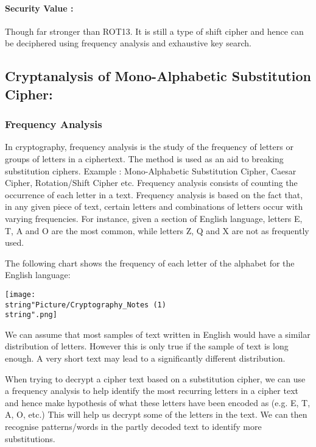 \documentclass[british]{article}
\begin{document}
\paragraph*{Security Value : }

Though far stronger than ROT13. It is still a type of shift cipher
and hence can be deciphered using frequency analysis and exhaustive
key search.

\vfill{}


\subsection{Cryptanalysis of Mono-Alphabetic Substitution Cipher:}

\subsubsection{Frequency Analysis}

In cryptography, frequency analysis is the study of the frequency
of letters or groups of letters in a ciphertext. The method is used
as an aid to breaking substitution ciphers. Example : Mono-Alphabetic
Substitution Cipher, Caesar Cipher, Rotation/Shift Cipher etc. Frequency
analysis consists of counting the occurrence of each letter in a text.
Frequency analysis is based on the fact that, in any given piece of
text, certain letters and combinations of letters occur with varying
frequencies. For instance, given a section of English language, letters
E, T, A and O are the most common, while letters Z, Q and X are not
as frequently used.

\medskip{}

\begin{center}
The following chart shows the frequency of each letter of the alphabet
for the English language:
\par\end{center}

\begin{center}
\texttt{[image: \\string"Picture/Cryptography\_Notes (1)\\string".png]}
\par\end{center}

\medskip{}

We can assume that most samples of text written in English would have
a similar distribution of letters. However this is only true if the
sample of text is long enough. A very short text may lead to a significantly
different distribution.

When trying to decrypt a cipher text based on a substitution cipher,
we can use a frequency analysis to help identify the most recurring
letters in a cipher text and hence make hypothesis of what these letters
have been encoded as (e.g. E, T, A, O, etc.) This will help us decrypt
some of the letters in the text. We can then recognise patterns/words
in the partly decoded text to identify more substitutions.
\end{document}
